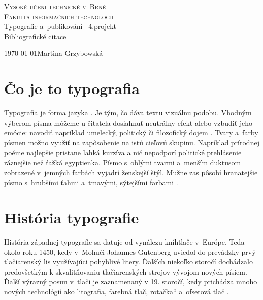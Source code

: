 \documentclass[a4paper,11pt, titlepage]{article}
\newcommand{\myuv}[1]{\quotedblbase #1\textquotedblleft}
\begin{document}
	
	\begin{titlepage}
		\begin{center}
			{\Huge\textsc{Vysoké učení technické v~Brně}}\\
			\vspace{+0.8em}
			{\huge\textsc{Fakulta informačních technologií}}\\
			\bigskip
			\LARGE{Typografie a~publikování\,--\,4.projekt}\\
			\vspace{-0.25em}
			\Huge{Bibliografické citace}
		\end{center}
		{\Large \today \hfill Martina Grzybowská}
	\end{titlepage}

\newpage
\pagestyle{plain}

\section{Čo je to typografia}
Typografia je forma jazyka \cite{Lupton:Thinking_with_type}. Je tým, čo dáva textu vizuálnu podobu. Vhodným výberom písma môžeme u čitateľa dosiahnuť neutrálny efekt alebo vzbudiť jeho emócie: navodiť napríklad umelecký, politický či filozofický dojem \cite{Ambrose:Typografie}. Tvary a~farby písmen možno využiť na zapôsobenie na istú cieľovú skupinu. Napríklad prírodnej poéme najlepšie pristane ľahká kurzíva a nič nepodporí politické prehlásenie ráznejšie než ťažká egyptienka. Písmo s~oblými tvarmi a~menším duktusom zobrazené v~jemných farbách vyjadrí ženskejší štýl. Mužne zas pôsobí hranatejšie písmo s~hrubšími ťahmi a~tmavými, sýtejšími farbami \cite{Saltz:Zaklady_typografie}.

\section{História typografie}
História západnej typografie sa datuje od vynálezu kníhtlače v~Európe. Teda okolo roku 1450, kedy v~Mohuči Johannes Gutenberg uviedol do
prevádzky prvý tlačiarenský lis využívajúci pohyblivé litery. Ďalších niekoľko storočí dochádzalo predovšetkým k skvalitňovaniu tlačiarenských
strojov vývojom nových písiem. Ďalší výrazný posun v~tlači je zaznamenaný v 19. storočí, kedy prichádza mnoho nových technológií ako 
litografia, farebná tlač, \myuv{rotačka} a~ofsetová tlač \cite{Jirasek:bakalarka}.
\end{document}
